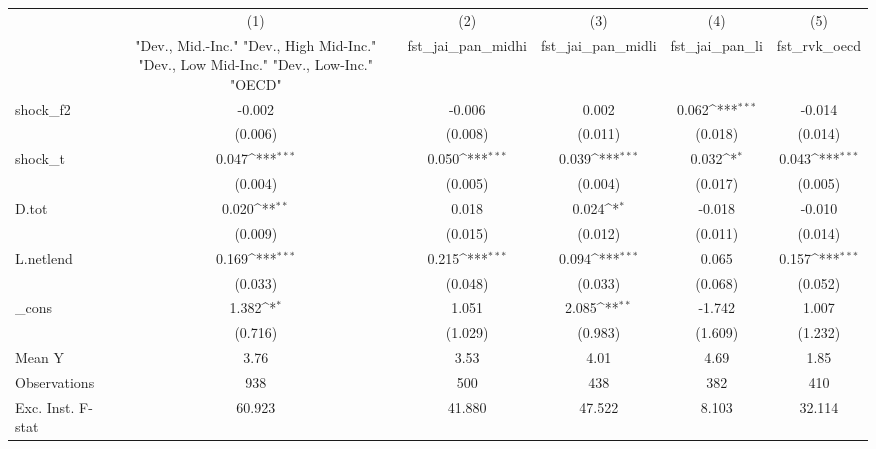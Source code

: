 {
\def\sym#1{\ifmmode^{#1}\else\(^{#1}\)\fi}
\begin{tabular}{l*{5}{c}}
\toprule
            &\multicolumn{1}{c}{(1)}&\multicolumn{1}{c}{(2)}&\multicolumn{1}{c}{(3)}&\multicolumn{1}{c}{(4)}&\multicolumn{1}{c}{(5)}\\
            &\multicolumn{1}{c}{ "Dev., Mid.-Inc." "Dev., High Mid-Inc." "Dev., Low Mid-Inc." "Dev., Low-Inc." "OECD" }&\multicolumn{1}{c}{fst\_jai\_pan\_midhi}&\multicolumn{1}{c}{fst\_jai\_pan\_midli}&\multicolumn{1}{c}{fst\_jai\_pan\_li}&\multicolumn{1}{c}{fst\_rvk\_oecd}\\
\midrule
shock\_f2    &      -0.002         &      -0.006         &       0.002         &       0.062\sym{***}&      -0.014         \\
            &     (0.006)         &     (0.008)         &     (0.011)         &     (0.018)         &     (0.014)         \\
\addlinespace
shock\_t     &       0.047\sym{***}&       0.050\sym{***}&       0.039\sym{***}&       0.032\sym{*}  &       0.043\sym{***}\\
            &     (0.004)         &     (0.005)         &     (0.004)         &     (0.017)         &     (0.005)         \\
\addlinespace
D.tot       &       0.020\sym{**} &       0.018         &       0.024\sym{*}  &      -0.018         &      -0.010         \\
            &     (0.009)         &     (0.015)         &     (0.012)         &     (0.011)         &     (0.014)         \\
\addlinespace
L.netlend   &       0.169\sym{***}&       0.215\sym{***}&       0.094\sym{***}&       0.065         &       0.157\sym{***}\\
            &     (0.033)         &     (0.048)         &     (0.033)         &     (0.068)         &     (0.052)         \\
\addlinespace
\_cons      &       1.382\sym{*}  &       1.051         &       2.085\sym{**} &      -1.742         &       1.007         \\
            &     (0.716)         &     (1.029)         &     (0.983)         &     (1.609)         &     (1.232)         \\
\midrule
Mean Y      &        3.76         &        3.53         &        4.01         &        4.69         &        1.85         \\
Observations&         938         &         500         &         438         &         382         &         410         \\
Exc. Inst. F-stat&      60.923         &      41.880         &      47.522         &       8.103         &      32.114         \\
\bottomrule
\end{tabular}
}
